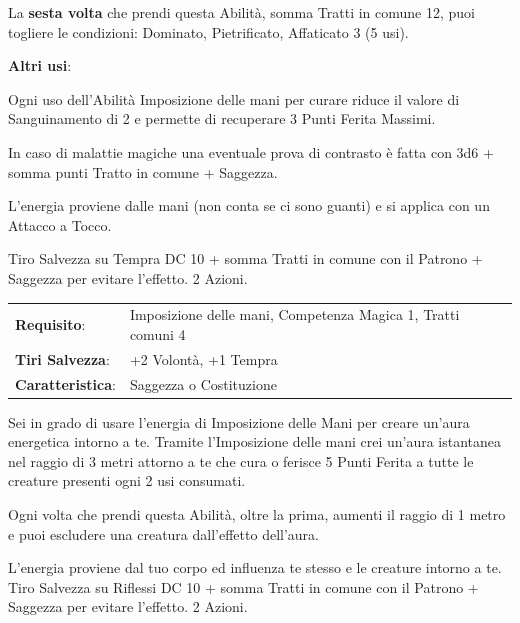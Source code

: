 \begin{multicols}{2}
La \textbf{sesta volta} che prendi questa Abilità, somma Tratti in comune 12, puoi togliere le condizioni: Dominato, Pietrificato, Affaticato 3 (5 usi).

\textbf{Altri usi}:

\smallskip

Ogni uso dell'Abilità Imposizione delle mani per curare riduce il valore di Sanguinamento di 2 e permette di recuperare 3 Punti Ferita Massimi.

In caso di malattie magiche una eventuale prova di contrasto è fatta con 3d6 + somma punti Tratto in comune + Saggezza.

L'energia proviene dalle mani (non conta se ci sono guanti) e si applica con un Attacco a Tocco.

Tiro Salvezza su Tempra DC 10 + somma Tratti in comune con il Patrono + Saggezza per evitare l'effetto. 2 Azioni.



\hspace{-0.2cm}\begin{tabularx}{\linewidth}{l@{\hspace{8pt}}X}
\rowcolor{gray!20}\textbf{Requisito}: & Imposizione delle mani, Competenza Magica 1, Tratti comuni 4\\
\textbf{Tiri Salvezza}: & +2 Volontà, +1 Tempra\\
\rowcolor{gray!20}\textbf{Caratteristica}: & Saggezza o Costituzione\\
\end{tabularx}\smallskip

Sei in grado di usare l'energia di Imposizione delle Mani per creare un'aura energetica intorno a te.
Tramite l'Imposizione delle mani crei un'aura istantanea nel raggio di 3 metri attorno a te che cura o ferisce 5 Punti Ferita a tutte le creature presenti ogni 2 usi consumati.

Ogni volta che prendi questa Abilità, oltre la prima, aumenti il raggio di 1 metro e puoi escludere una creatura dall'effetto dell'aura.

L'energia proviene dal tuo corpo ed influenza te stesso e le creature intorno a te. Tiro Salvezza su Riflessi DC 10 + somma Tratti in comune con il Patrono + Saggezza per evitare l'effetto.  2 Azioni.

%


\end{multicols}
